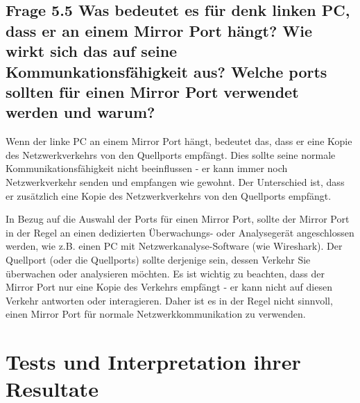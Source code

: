 \documentclass{article}
\begin{document}
\subsection*{Frage 5.5 \normalfont Was bedeutet es für denk linken PC, dass er an einem Mirror Port hängt? Wie wirkt sich das auf seine Kommunkationsfähigkeit aus? Welche ports sollten für einen Mirror Port verwendet werden und warum?}
Wenn der linke PC an einem Mirror Port hängt, bedeutet das, dass er eine Kopie des Netzwerkverkehrs von den Quellports empfängt. Dies sollte seine normale Kommunikationsfähigkeit nicht beeinflussen - er kann immer noch Netzwerkverkehr senden und empfangen wie gewohnt. Der Unterschied ist, dass er zusätzlich eine Kopie des Netzwerkverkehrs von den Quellports empfängt.

In Bezug auf die Auswahl der Ports für einen Mirror Port, sollte der Mirror Port in der Regel an einen dedizierten Überwachungs- oder Analysegerät angeschlossen werden, wie z.B. einen PC mit Netzwerkanalyse-Software (wie Wireshark). Der Quellport (oder die Quellports) sollte derjenige sein, dessen Verkehr Sie überwachen oder analysieren möchten. Es ist wichtig zu beachten, dass der Mirror Port nur eine Kopie des Verkehrs empfängt - er kann nicht auf diesen Verkehr antworten oder interagieren. Daher ist es in der Regel nicht sinnvoll, einen Mirror Port für normale Netzwerkkommunikation zu verwenden.\\

\pagebreak
\section{Tests und Interpretation ihrer Resultate}
\end{document}
